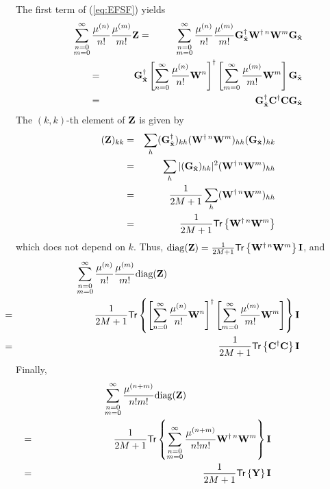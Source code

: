 \documentclass[final, a4paper]{IEEEtran}
\newcommand{\xv}{{\bf x}}
\newcommand{\Cm}{{\bf C}}
\newcommand{\Gm}{{\bf G}}
\newcommand{\Id}{{\bf I}}
\newcommand{\Wm}{{\bf W}}
\newcommand{\Ym}{{\bf Y}}
\newcommand{\Zm}{{\bf Z}}
\def\xvh{{\hat{\xv}}}
\newcommand{\diag}{{\hbox{diag}}}
\def\trace{\mathsf{Tr}}
\def\non{\nonumber\\}
\begin{document}
The first term of (\ref{eq:EFSF}) yields
\begin{eqnarray*}
\sum_{\substack{n=0\\m=0}}^\infty\frac{\mu^{(n)}}{n!}\frac{\mu^{(m)}}{m!}\Zm
& = & \sum_{\substack{n=0 \\ m=0}}^\infty  \frac{\mu^{(n)}}{n!}\frac{\mu^{(m)}}{m!}\Gm_\xvh\Herm\Wm^{\dagger\,n}\Wm^m\Gm_\xvh \non
&\hspace{-12ex}=&\hspace{-6ex}
\Gm_\xvh\Herm \left[\sum_{n=0}^\infty \frac{\mu^{(n)}}{n!}\Wm^n\right]\Herm\left[\sum_{m=0}^\infty \frac{\mu^{(m)}}{m!}\Wm^m\right]\Gm_\xvh
\non
&\hspace{-12ex}=&\hspace{-6ex}
 \Gm_\xvh\Herm \Cm\Herm \Cm \Gm_\xvh
\end{eqnarray*}
The $(k,k)$-th element of $\Zm$ is given by
\begin{eqnarray*}
(\Zm)_{kk} &=& \sum_h (\Gm_\xvh\Herm)_{kh} (\Wm^{\dagger\,n} \Wm^m  )_{hh} (\Gm_\xvh)_{hk} \non
&=& \sum_h |(\Gm_\xvh)_{hk}|^2 (\Wm^{\dagger\,n} \Wm^m  )_{hh}\non
&=& \frac{1}{2M+1}\sum_h ( \Wm^{\dagger\,n} \Wm^m  )_{hh} \non
&=& \frac{1}{2M+1}\trace\left\{\Wm^{\dagger\,n} \Wm^m\right\}
\end{eqnarray*}
which does not depend on $k$. Thus,
$\diag(\Zm) = \frac{1}{2M+1}\trace\left\{\Wm^{\dagger\,n} \Wm^m\right\} \Id$,
and
\begin{eqnarray*}
\sum_{\substack{n=0 \\ m=0}}^\infty \frac{\mu^{(n)}}{n!}\frac{\mu^{(m)}}{m!}\diag(\Zm) && \non 
&\hspace{-40ex}=&\hspace{-20ex}
\frac{1}{2M+1}\trace\left\{\left[\sum_{n=0}^\infty \frac{\mu^{(n)}}{n!}\Wm^n\right]\Herm
\left[\sum_{m=0}^\infty\frac{\mu^{(m)}}{m!} \Wm^m\right]\right\} \Id \non 
&\hspace{-40ex}=&\hspace{-20ex}
\frac{1}{2M+1}\trace\left\{\Cm\Herm \Cm\right\} \Id
\end{eqnarray*}
Finally,
\begin{eqnarray*}
\sum_{\substack{n=0 \\ m=0}}^\infty \frac{\mu^{(n+m)}}{n!m!}\diag(\Zm)
&& \non
&\hspace{-40ex}=&\hspace{-20ex}
\frac{1}{2M+1}\trace\left\{\sum_{\substack{n=0 \\ m=0}}^\infty \frac{\mu^{(n+m)}}{n!m!}\Wm^{\dagger\,n}\Wm^m\right\} \Id \non 
&\hspace{-40ex}=&\hspace{-20ex}\frac{1}{2M+1}\trace\left\{\Ym\right\} \Id \non
\end{eqnarray*}
\end{document}
